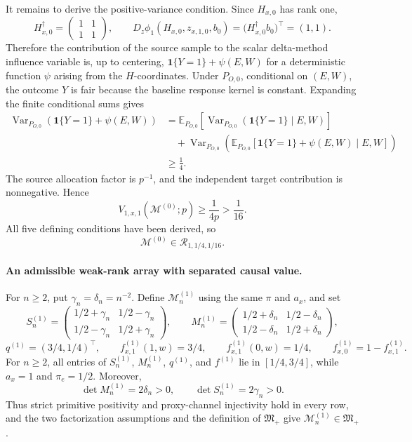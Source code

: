 It remains to derive the positive-variance condition. Since \(H_{x,0}\) has rank one,
\[
H_{x,0}^{\dagger}=
\begin{pmatrix}1&1\\1&1\end{pmatrix},
\qquad
D_z\phi_1(H_{x,0},z_{x,1,0},b_0)
=\bigl(H_{x,0}^{\dagger}b_0\bigr)^{\top}=(1,1).
\]
Therefore the contribution of the source sample to the scalar delta-method influence variable is, up to centering, \(\mathbf 1\{Y=1\}+\psi(E,W)\) for a deterministic function \(\psi\) arising from the \(H\)-coordinates. Under \(P_{O,0}\), conditional on \((E,W)\), the outcome \(Y\) is fair because the baseline response kernel is constant. Expanding the finite conditional sums gives
\[
\begin{split}
\operatorname{Var}_{P_{O,0}}\!\left(\mathbf 1\{Y=1\}+\psi(E,W)\right)
&=\mathbb E_{P_{O,0}}\!\left[\operatorname{Var}_{P_{O,0}}\!\left(\mathbf 1\{Y=1\}\mid E,W\right)\right]\\
&\quad+\operatorname{Var}_{P_{O,0}}\!\left(
\mathbb E_{P_{O,0}}[\mathbf 1\{Y=1\}+\psi(E,W)\mid E,W]
\right)\\
&\ge\frac14.
\end{split}
\]
The source allocation factor is \(p^{-1}\), and the independent target contribution is nonnegative. Hence
\[
V_{1,x,1}(\mathcal M^{(0)};p)\ge\frac{1}{4p}>\frac1{16}.
\]
All five defining conditions have been derived, so
\[
\mathcal M^{(0)}\in\mathcal R_{1,1/4,1/16}.
\]

\paragraph{An admissible weak-rank array with separated causal value.}
For \(n\ge2\), put \(\gamma_n=\delta_n=n^{-2}\). Define \(\mathcal M^{(1)}_n\) using the same \(\pi\) and \(a_x\), and set
\[
S^{(1)}_n=
\begin{pmatrix}
1/2+\gamma_n&1/2-\gamma_n\\
1/2-\gamma_n&1/2+\gamma_n
\end{pmatrix},\qquad
M^{(1)}_n=
\begin{pmatrix}
1/2+\delta_n&1/2-\delta_n\\
1/2-\delta_n&1/2+\delta_n
\end{pmatrix},
\]
\[
q^{(1)}=(3/4,1/4)^{\top},\qquad
f^{(1)}_{x,1}(1,w)=3/4,\qquad
f^{(1)}_{x,1}(0,w)=1/4,\qquad
f^{(1)}_{x,0}=1-f^{(1)}_{x,1}.
\]
For \(n\ge2\), all entries of \(S^{(1)}_n\), \(M^{(1)}_n\), \(q^{(1)}\), and \(f^{(1)}\) lie in \([1/4,3/4]\), while \(a_x=1\) and \(\pi_e=1/2\). Moreover,
\[
\det M^{(1)}_n=2\delta_n>0,
\qquad
\det S^{(1)}_n=2\gamma_n>0.
\]
Thus strict primitive positivity and proxy-channel injectivity hold in every row, and the two factorization assumptions and the definition of \(\mathfrak M_{+}\) give \(\mathcal M^{(1)}_n\in\mathfrak M_{+}\).

